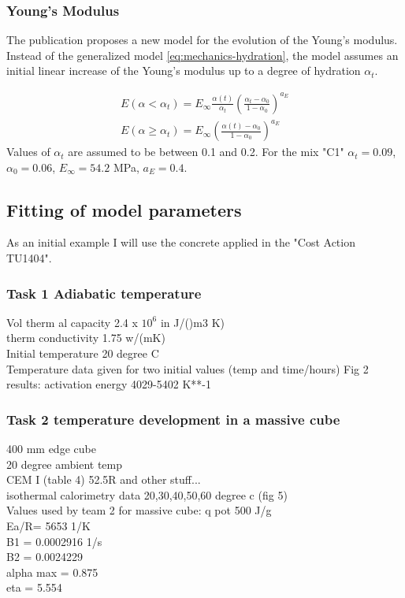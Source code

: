 \subsubsection{Young's Modulus}
The publication proposes a new model for the evolution of the Young's modulus.
Instead of the generalized model \eqref{eq:mechanics-hydration}, the model assumes an initial linear increase of the Young's modulus up to a degree of hydration $\alpha_t$.

\begin{align}
	E(\alpha < \alpha_t) = E_\infty  \frac{\alpha(t)}{\alpha_t}\left( \frac{\alpha_t-\alpha_0}{1-\alpha_0}\right)^{a_E}  \\
	E(\alpha \ge \alpha_t) = E_\infty  \left( \frac{\alpha(t)-\alpha_0}{1-\alpha_0}\right)^{a_E}  
\end{align}
Values of $\alpha_t$ are assumed to be between 0.1 and 0.2.
For the mix "C1" $\alpha_t = 0.09$, $\alpha_0 = 0.06$, $E_\infty = 54.2$ MPa, $a_E = 0.4$.






\subsection{Fitting of model parameters}
As an initial example I will use the concrete applied in the "Cost Action TU1404".
\subsubsection{Task 1 Adiabatic temperature}
Vol therm al capacity 2.4 x $10^6$ in J/()m3 K)\\
therm conductivity 1.75 w/(mK)\\
Initial temperature 20 degree C\\ 
Temperature data given for two initial values (temp and time/hours) Fig 2\\
results: activation energy 4029-5402 K**-1

\subsubsection{Task 2 temperature development in a massive cube}
400 mm edge cube\\
20 degree ambient temp\\
CEM I (table 4) 52.5R and other stuff...\\
isothermal calorimetry data 20,30,40,50,60 degree c (fig 5)\\
Values used by team 2 for massive cube:
q pot 500 J/g\\
Ea/R= 5653 1/K\\
B1 = 0.0002916 1/s\\
B2 = 0.0024229\\
alpha max = 0.875\\
eta = 5.554